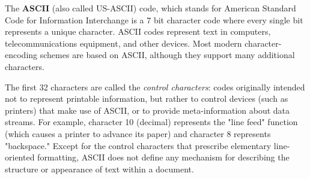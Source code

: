     \begin{definition}[ASCII]
      \label{def:ascii}
      The \textbf{ASCII} (also called US-ASCII) code, which stands for American Standard Code for Information Interchange is a $7$ bit character code where every single bit represents a unique character. ASCII codes represent text in computers, telecommunications equipment, and other devices. Most modern character-encoding schemes are based on ASCII, although they support many additional characters.

      The first 32 characters are called the \textit{control characters}: codes originally intended not to represent printable information, but rather to control devices (such as printers) that make use of ASCII, or to provide meta-information about data streams. For example, character 10 (decimal) represents the "line feed" function (which causes a printer to advance its paper) and character 8 represents "backspace." Except for the control characters that prescribe elementary line-oriented formatting, ASCII does not define any mechanism for describing the structure or appearance of text within a document. 
      \begin{center}
\end{center}
\end{definition}
